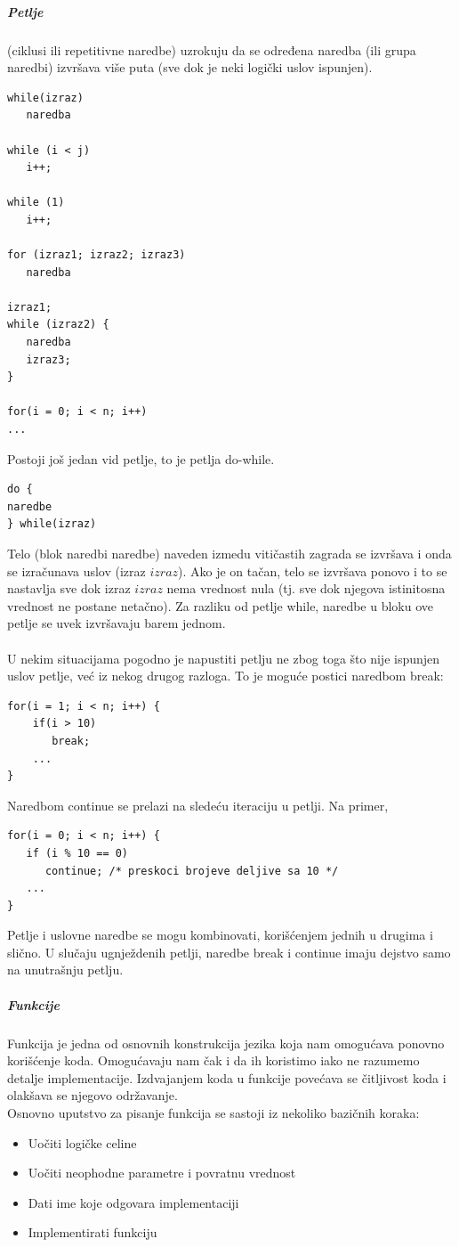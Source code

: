 \documentclass[a4paper]{article}
\begin{document}
\subparagraph{Petlje}(ciklusi ili repetitivne naredbe) uzrokuju da se određena
naredba (ili grupa naredbi) izvršava više puta (sve dok je neki logički uslov ispunjen).
\begin{verbatim}
while(izraz)
   naredba
   
while (i < j)
   i++;
   
while (1)
   i++;
   
for (izraz1; izraz2; izraz3)
   naredba

izraz1;
while (izraz2) {
   naredba
   izraz3;
}

for(i = 0; i < n; i++)
...
\end{verbatim}

Postoji još jedan vid petlje, to je petlja do-while.
\begin{verbatim}
do {
naredbe
} while(izraz)
\end{verbatim}
Telo (blok naredbi naredbe) naveden izmedu vitičastih
zagrada se izvršava i onda se izračunava uslov (izraz $izraz$).
Ako je on tačan, telo se izvršava ponovo i to se nastavlja sve
dok izraz $izraz$ nema vrednost nula (tj. sve dok njegova
istinitosna vrednost ne postane netačno).
Za razliku od petlje while, naredbe u bloku ove petlje se uvek
izvršavaju barem jednom.\\\\

U nekim situacijama pogodno je napustiti petlju ne zbog toga
što nije ispunjen uslov petlje, već iz nekog drugog razloga. To
je moguće postici naredbom break:
\begin{verbatim}
for(i = 1; i < n; i++) {
    if(i > 10)
       break;
    ...
}
\end{verbatim}
Naredbom continue se prelazi na sledeću iteraciju u petlji.
Na primer,
\begin{verbatim}
for(i = 0; i < n; i++) {
   if (i % 10 == 0)
      continue; /* preskoci brojeve deljive sa 10 */
   ...
}
\end{verbatim}
Petlje i uslovne naredbe se mogu kombinovati, korišćenjem jednih u drugima i slično.
U slučaju ugnježdenih petlji, naredbe break i continue imaju
dejstvo samo na unutrašnju petlju.

\subparagraph{Funkcije}
Funkcija je jedna od osnovnih konstrukcija jezika koja nam omogućava ponovno korišćenje koda. Omogućavaju nam čak i da ih koristimo iako ne razumemo detalje implementacije. Izdvajanjem koda u funkcije povećava se čitljivost koda i olakšava se njegovo održavanje.   
\\
Osnovno uputstvo za pisanje funkcija se sastoji iz nekoliko bazičnih koraka:
\begin{itemize}
\item Uočiti logičke celine
\item Uočiti neophodne parametre i povratnu vrednost 
\item Dati ime koje odgovara implementaciji
\item Implementirati funkciju
\end{itemize}
\end{document}
